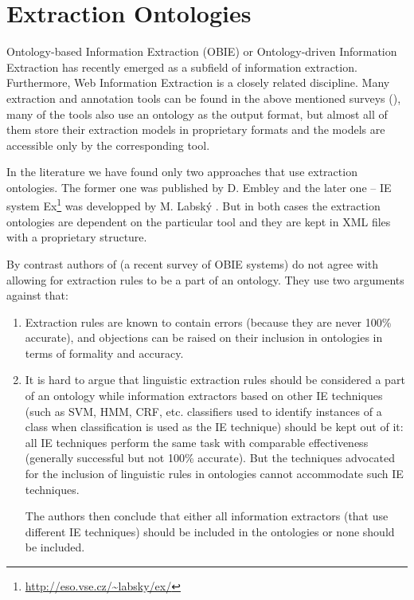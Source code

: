 \section{Extraction Ontologies} \label{sec:relwork_ext_ont}

Ontology-based Information Extraction (OBIE) \citep{citeulike:7291004} or Ontology-driven Information Extraction \citep{Yildiz:2007:OMO:1793154.1793216} has recently emerged as a subfield of information extraction. Furthermore, Web Information Extraction \citep{DBLP:journals/tkde/ChangKGS06} is a closely related discipline. Many extraction and annotation tools can be found in the above mentioned surveys (\citep{citeulike:7291004,DBLP:journals/tkde/ChangKGS06}), many of the tools also use an ontology as the output format, but almost all of them store their extraction models in proprietary formats and the models are accessible only by the corresponding tool.

In the literature we have found only two approaches that use extraction ontologies. The former one was published by D. Embley \citep{DBLP:conf/er/EmbleyTL02,Embley:2004:TSU:1012294.1012295}
and the later one -- IE system Ex\footnote{\url{http://eso.vse.cz/~labsky/ex/}} was developped by M. Labsk\'{y} \citep{springerlink:10.1007/978-3-642-01891-6_5}. 
But in both cases the extraction ontologies are dependent on the particular tool and they are kept in XML files with a proprietary structure.


By contrast authors of \citep{citeulike:7291004} (a recent survey of OBIE systems) do not agree with allowing for extraction rules to be a part of an ontology. They use two arguments against that:
\begin{enumerate}
	\item Extraction rules are known to contain errors (because they are never 100\% accurate), and objections can be raised on their inclusion in ontologies in terms of formality and accuracy.

	\item It is hard to argue that linguistic extraction rules should be considered a part of an ontology while information extractors based on other IE techniques (such as SVM, HMM, CRF, etc. classifiers used to identify instances of a class when classification is used as the IE technique) should be kept out of it: all IE techniques perform the same task with comparable effectiveness (generally successful but not 100\% accurate). But the techniques advocated for the inclusion of linguistic rules in ontologies cannot accommodate such IE techniques.
	
The authors then conclude that either all information extractors (that use different IE techniques) should be included in the ontologies or none should be included.
\end{enumerate}



